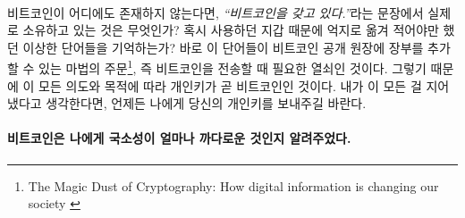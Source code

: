 \paragraph{}
비트코인이 어디에도 존재하지 않는다면, \textit{\enquote{비트코인을 갖고 있다.}}라는 문장에서 실제로 소유하고 있는 것은 무엇인가? 
혹시 사용하던 지갑 때문에 억지로 옮겨 적어야만 했던 이상한 단어들을 기억하는가?
바로 이 단어들이 비트코인 공개 원장에 장부를 추가할 수 있는 마법의 주문\footnote{The Magic Dust of Cryptography: How digital
	information is changing our society \cite{gigi:magic-spell}}, 즉 비트코인을 전송할 때 필요한 열쇠인 것이다. 
그렇기 때문에 이 모든 의도와 목적에 따라 개인키가 곧 비트코인인 것이다. 
내가 이 모든 걸 지어냈다고 생각한다면, 언제든 나에게 당신의 개인키를 보내주길 바란다.

\paragraph{비트코인은 나에게 국소성이 얼마나 까다로운 것인지 알려주었다.}

%
%
%
%
%
%
%
